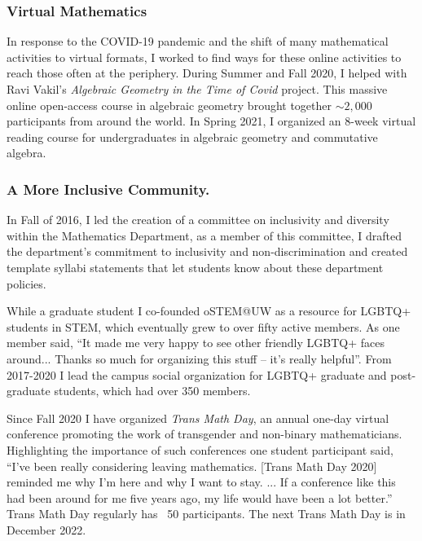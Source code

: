 \documentclass[11pt,reqno]{amsart}
\theoremstyle{remark}
\begin{document}
\subsubsection{Virtual Mathematics}
In response to the COVID-19 pandemic and the shift of many mathematical activities to virtual formats, I worked to find ways for these online activities to reach those often at the periphery. During Summer and Fall 2020, I helped with Ravi Vakil's \textit{Algebraic Geometry in the Time of Covid} project. This massive online open-access course in algebraic geometry brought together $\sim2,000$ participants from around the world. In Spring 2021, I organized an 8-week virtual reading course for undergraduates in algebraic geometry and commutative algebra. %


\subsubsection{A More Inclusive Community.} In Fall of 2016, I led the creation of a committee on inclusivity and diversity within the Mathematics Department, as a member of this committee, I drafted the department's commitment to inclusivity and non-discrimination and created template syllabi statements that let students know about these department policies. 

While a graduate student I co-founded oSTEM@UW as a resource for LGBTQ+ students in STEM, which eventually grew to over fifty active members. As one member said, ``It made me very happy to see other friendly LGBTQ+ faces around... Thanks so much for organizing this stuff -- it's really helpful''. %
From 2017-2020 I lead the campus social organization for LGBTQ+ graduate and post-graduate students, which had over 350 members. %

Since Fall 2020 I have organized \textit{Trans Math Day}, an annual one-day virtual conference promoting the work of transgender and non-binary mathematicians. Highlighting the importance of such conferences one student participant said, ``I've been really considering leaving mathematics.  [Trans Math Day 2020] reminded me why I'm here and why I want to stay. ... If a conference like this had been around for me five years ago, my life would have been a lot better.'' Trans Math Day regularly has ~50 participants. The next Trans Math Day is in December 2022. 
\end{document}
